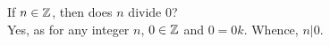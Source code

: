 \guard



\begin{exmp}
\label{exmp:everyIntegerDivides0}
  If $n\in\mathbb{Z}$, then does $n$ divide $0$?\\
  Yes, as for any integer $n$, $0\in\mathbb{Z}$ and $0=0k$.
  Whence, $n\vert 0$.
\end{exmp}
